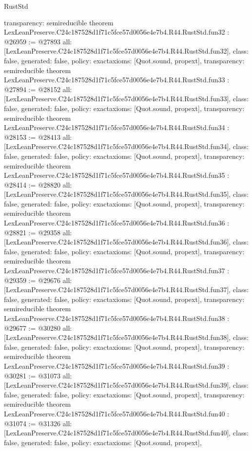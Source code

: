 \begin{lexlean}{RustStd}
\begin{coremodule}
{  transparency: semireducible
}
theorem LexLeanPreserve.C24c187528d1f71c5fce57d0056e4e7b4.R44.RustStd.fun32 : @26959 := @27893 {
  all: [LexLeanPreserve.C24c187528d1f71c5fce57d0056e4e7b4.R44.RustStd.fun32],
  class: false,
  generated: false,
  policy: exact{axioms: [Quot.sound, propext]},
  transparency: semireducible
}
theorem LexLeanPreserve.C24c187528d1f71c5fce57d0056e4e7b4.R44.RustStd.fun33 : @27894 := @28152 {
  all: [LexLeanPreserve.C24c187528d1f71c5fce57d0056e4e7b4.R44.RustStd.fun33],
  class: false,
  generated: false,
  policy: exact{axioms: [Quot.sound, propext]},
  transparency: semireducible
}
theorem LexLeanPreserve.C24c187528d1f71c5fce57d0056e4e7b4.R44.RustStd.fun34 : @28153 := @28413 {
  all: [LexLeanPreserve.C24c187528d1f71c5fce57d0056e4e7b4.R44.RustStd.fun34],
  class: false,
  generated: false,
  policy: exact{axioms: [Quot.sound, propext]},
  transparency: semireducible
}
theorem LexLeanPreserve.C24c187528d1f71c5fce57d0056e4e7b4.R44.RustStd.fun35 : @28414 := @28820 {
  all: [LexLeanPreserve.C24c187528d1f71c5fce57d0056e4e7b4.R44.RustStd.fun35],
  class: false,
  generated: false,
  policy: exact{axioms: [Quot.sound, propext]},
  transparency: semireducible
}
theorem LexLeanPreserve.C24c187528d1f71c5fce57d0056e4e7b4.R44.RustStd.fun36 : @28821 := @29358 {
  all: [LexLeanPreserve.C24c187528d1f71c5fce57d0056e4e7b4.R44.RustStd.fun36],
  class: false,
  generated: false,
  policy: exact{axioms: [Quot.sound, propext]},
  transparency: semireducible
}
theorem LexLeanPreserve.C24c187528d1f71c5fce57d0056e4e7b4.R44.RustStd.fun37 : @29359 := @29676 {
  all: [LexLeanPreserve.C24c187528d1f71c5fce57d0056e4e7b4.R44.RustStd.fun37],
  class: false,
  generated: false,
  policy: exact{axioms: [Quot.sound, propext]},
  transparency: semireducible
}
theorem LexLeanPreserve.C24c187528d1f71c5fce57d0056e4e7b4.R44.RustStd.fun38 : @29677 := @30280 {
  all: [LexLeanPreserve.C24c187528d1f71c5fce57d0056e4e7b4.R44.RustStd.fun38],
  class: false,
  generated: false,
  policy: exact{axioms: [Quot.sound, propext]},
  transparency: semireducible
}
theorem LexLeanPreserve.C24c187528d1f71c5fce57d0056e4e7b4.R44.RustStd.fun39 : @30281 := @31073 {
  all: [LexLeanPreserve.C24c187528d1f71c5fce57d0056e4e7b4.R44.RustStd.fun39],
  class: false,
  generated: false,
  policy: exact{axioms: [Quot.sound, propext]},
  transparency: semireducible
}
theorem LexLeanPreserve.C24c187528d1f71c5fce57d0056e4e7b4.R44.RustStd.fun40 : @31074 := @31326 {
  all: [LexLeanPreserve.C24c187528d1f71c5fce57d0056e4e7b4.R44.RustStd.fun40],
  class: false,
  generated: false,
  policy: exact{axioms: [Quot.sound, propext]},
}
\end{coremodule}
\end{lexlean}
